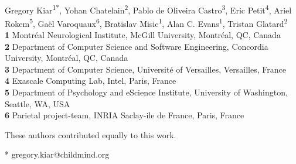 \documentclass[10pt,letterpaper]{article}
\begin{document}
\vspace*{0.2in}

\begin{flushleft}
{\Large
\textbf{} %
}
\newline
\\
Gregory Kiar\textsuperscript{1*},
Yohan Chatelain\textsuperscript{2},
Pablo de Oliveira Castro\textsuperscript{3},
Eric Petit\textsuperscript{4},
Ariel Rokem\textsuperscript{5},
Gaël Varoquaux\textsuperscript{6},
Bratislav Misic\textsuperscript{1},
Alan C. Evans\textsuperscript{1\dag},
Tristan Glatard\textsuperscript{2\dag} %
\\
\bigskip
\textbf{1} Montréal Neurological Institute, McGill University, Montréal, QC, Canada
\\
\textbf{2} Department of Computer Science and Software Engineering, Concordia University, Montréal, QC, Canada
\\
\textbf{3} Department of Computer Science, Université of Versailles, Versailles, France
\\
\textbf{4} Exascale Computing Lab, Intel, Paris, France
\\
\textbf{5} Department of Psychology and eScience Institute, University of Washington, Seattle, WA, USA
\\
\textbf{6} Parietal project-team, INRIA Saclay-ile de France, Paris, France
\\
\bigskip


% 
%
\dag These authors contributed equally to this work.

* gregory.kiar@childmind.org

\end{flushleft}
\end{document}
